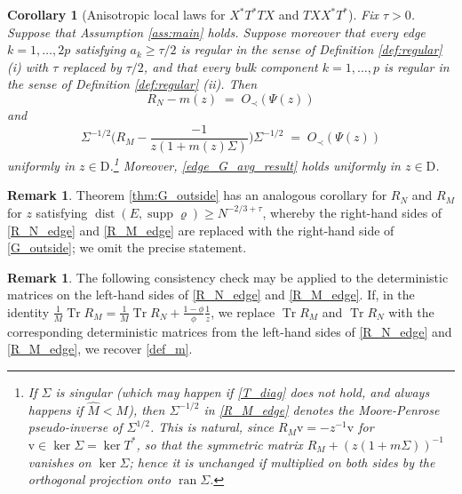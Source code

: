 \documentclass[11pt]{article} %
\numberwithin{equation}{section}
\numberwithin{figure}{section}
\theoremstyle{plain} %
\newtheorem{corollary}[theorem]{Corollary}
\theoremstyle{definition} %
\newtheorem{remark}[theorem]{Remark}
\newcommand{\f}[1]{\boldsymbol{\mathrm{#1}}} %
\newcommand{\wh}{\widehat}
\renewcommand{\geq}{\geqslant}
\newcommand{\pbb}[1]{\biggl({#1}\biggr)}
\DeclareMathOperator{\tr}{Tr}
\DeclareMathOperator{\supp}{supp}
\DeclareMathOperator{\ran}{ran}
\DeclareMathOperator{\dist}{dist}
\begin{document}
\begin{corollary}[Anisotropic local laws for $X^* T^* T X$ and $T X X^* T^*$] \label{cor:GM_GN}
Fix $\tau > 0$. Suppose that Assumption \ref{ass:main} holds. Suppose moreover that every edge $k = 1, \dots, 2p$ satisfying $a_k \geq \tau/2$ is regular in the sense of Definition \ref{def:regular} (i) with $\tau$ replaced by $\tau/2$, and that every bulk component $k = 1, \dots, p$ is regular in the sense of Definition \ref{def:regular} (ii). Then
\begin{equation} \label{R_N_edge}
R_N - m(z) \;=\; O_\prec(\Psi(z))
\end{equation}
and 
\begin{equation} \label{R_M_edge}
\Sigma^{-1/2} \pbb{R_M - \frac{-1}{z (1 + m(z) \Sigma)}} \Sigma^{-1/2} \;=\; O_\prec(\Psi(z))
\end{equation}
uniformly in $z \in \f D$.\footnote{If $\Sigma$ is singular (which may happen if \eqref{T_diag} does not hold, and always happens if $\wh M < M$), then $\Sigma^{-1/2}$ in \eqref{R_M_edge} denotes the Moore-Penrose pseudo-inverse of $\Sigma^{1/2}$. This is natural, since $R_M \f v = - z^{-1} \f v$ for $\f v \in \ker \Sigma = \ker T^*$, so that the symmetric matrix $R_M + (z (1 + m \Sigma))^{-1}$ vanishes on $\ker \Sigma$; hence it is unchanged if multiplied on both sides by the orthogonal projection onto $\ran \Sigma$.}
Moreover, \eqref{edge_G_avg_result} holds uniformly in $z \in \f D$.
\end{corollary}

\begin{remark}
Theorem \ref{thm:G_outside} has an analogous corollary for $R_N$ and $R_M$ for $z$ satisfying $\dist(E, \supp \varrho) \geq N^{-2/3 + \tau}$, whereby the right-hand sides of \eqref{R_N_edge} and \eqref{R_M_edge} are replaced with the right-hand side of \eqref{G_outside}; we omit the precise statement.
\end{remark}


\begin{remark}
The following consistency check may be applied to the deterministic matrices on the left-hand sides of \eqref{R_N_edge} and \eqref{R_M_edge}.
If, in the identity $\frac{1}{M} \tr R_M = \frac{1}{M} \tr R_N + \frac{1 - \phi}{\phi} \frac{1}{z}$, we replace $\tr R_M$ and $\tr R_N$ with the corresponding deterministic matrices from the left-hand sides of \eqref{R_N_edge} and \eqref{R_M_edge}, we recover \eqref{def_m}.
\end{remark}
\end{document}
